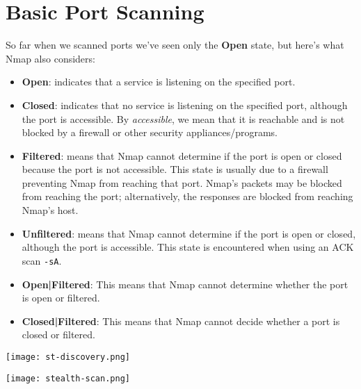 \documentclass[11pt]{article}
\begin{document}
\setcounter{section}{3}
\setcounter{page}{13}  %

\renewcommand{\thesubsubsection}{\thesubsection.\Roman{subsubsection}}

\section{Basic Port Scanning}

\begin{tcolorbox}[colback=codebackground, colframe=warningcolor]
  So far when we scanned ports we've seen only the \textbf{Open}
  state, but here's what Nmap also considers:

  \begin{itemize}[leftmargin=*]
    \item \textbf{Open}: indicates that a service is listening on the
      specified port.
    \item \textbf{Closed}: indicates that no service is listening on
      the specified port, although the port is accessible. By
      \textit{accessible}, we mean that it is reachable and is not
      blocked by a firewall or other security appliances/programs.
    \item \textbf{Filtered}: means that Nmap cannot determine if the
      port is open or closed because the port is not accessible. This
      state is usually due to a firewall preventing Nmap from
      reaching that port. Nmap's packets may be blocked from reaching
      the port; alternatively, the responses are blocked from
      reaching Nmap's host.
    \item \textbf{Unfiltered}: means that Nmap cannot determine if
      the port is open or closed, although the port is accessible.
      This state is encountered when using an ACK scan \texttt{-sA}.
    \item \textbf{Open|Filtered}: This means that Nmap cannot
      determine whether the port is open or filtered.
    \item \textbf{Closed|Filtered}: This means that Nmap cannot
      decide whether a port is closed or filtered.
  \end{itemize}
\end{tcolorbox}
\begin{center}
  \texttt{[image: st-discovery.png]}
  \label{fig:sT-scan}
\end{center}
\begin{center}
  \texttt{[image: stealth-scan.png]}
  \label{fig:sS-scan}
\end{center}
\end{document}
